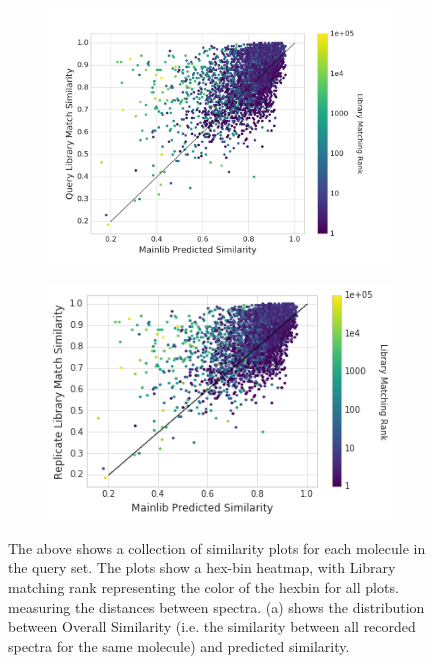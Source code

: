 \begin{figure}[h]
\begin{subfigure}[b]{0.48\linewidth}
        \includegraphics[width=\linewidth]{./main_predicted_query_libmatch.png}
        \caption{}
    \end{subfigure}
    \begin{subfigure}[b]{0.48\linewidth}
        \includegraphics[width=\linewidth]{./main_predicted_replicates_libmatch.png}
        \caption{}
    \end{subfigure}
    \caption[Similarity Plots]{
    The above shows a collection of similarity plots for each molecule in the query set.
    The plots show a hex-bin heatmap, with Library matching rank representing the color of
    the hexbin for all plots.
    measuring the distances between spectra.
    (a) shows the distribution between Overall Similarity (i.e. the similarity between
     all recorded spectra for the same molecule) and predicted similarity.
}
\end{figure}
